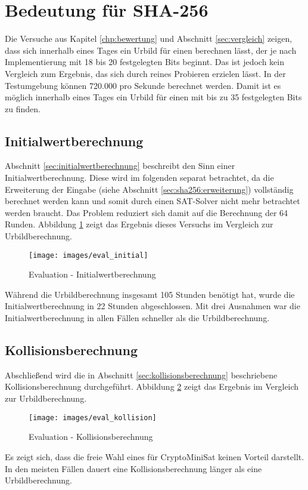 \section{Bedeutung für SHA-256}

Die Versuche aus Kapitel \ref{chp:bewertung} und Abschnitt \ref{sec:vergleich} zeigen, dass sich innerhalb eines Tages
ein Urbild für einen  berechnen lässt, der je nach Implementierung mit 18 bis 20 festgelegten Bits beginnt. Das ist jedoch
kein Vergleich zum Ergebnis, das sich durch reines Probieren erzielen lässt. In der Testumgebung können 720.000  pro Sekunde
berechnet werden. Damit ist es möglich innerhalb eines Tages ein Urbild für einen  mit bis zu 35 festgelegten Bits zu finden.

\subsection{Initialwertberechnung}
Abschnitt \ref{sec:initialwertberechnung} beschreibt den Sinn einer Initialwertberechnung. Diese wird im folgenden separat
betrachtet, da die Erweiterung der Eingabe (siehe Abschnitt \ref{sec:sha256:erweiterung}) vollständig berechnet werden kann
und somit durch einen SAT-Solver nicht mehr betrachtet werden braucht. Das Problem reduziert sich damit auf die Berechnung
der 64 Runden. Abbildung \ref{fig:eval_initial} zeigt das Ergebnis dieses Versuchs im Vergleich zur Urbildberechnung.
\begin{figure}[!h]
  \centering
  \texttt{[image: images/eval\_initial]}
  \caption{Evaluation - Initialwertberechnung}
  \label{fig:eval_initial}
\end{figure}

Während die Urbildberechnung insgesamt 105 Stunden benötigt hat, wurde die Initialwertberechnung in 22 Stunden
abgeschlossen. Mit drei Ausnahmen war die Initialwertberechnung in allen Fällen schneller als die Urbildberechnung.

\subsection{Kollisionsberechnung}
Abschließend wird die in Abschnitt \ref{sec:kollisionsberechnung} beschriebene Kollisionsberechnung durchgeführt.
Abbildung \ref{fig:eval_kollision} zeigt das Ergebnis im Vergleich zur Urbildberechnung. \clearpage
\begin{figure}[!h]
  \centering
  \texttt{[image: images/eval\_kollision]}
  \caption{Evaluation - Kollisionsberechnung}
  \label{fig:eval_kollision}
\end{figure}

Es zeigt sich, dass die freie Wahl eines  für CryptoMiniSat keinen Vorteil darstellt. In den meisten Fällen
dauert eine Kollisionsberechnung länger als eine Urbildberechnung.